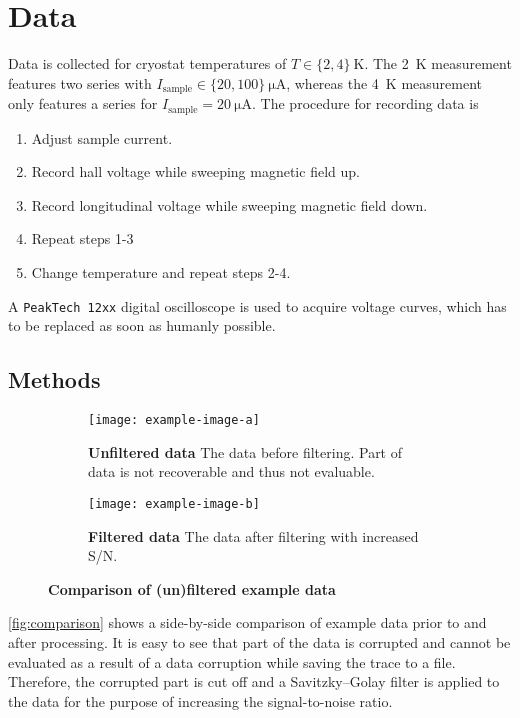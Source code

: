 \chapter{Data}
Data is collected for cryostat temperatures of $T\in\{ 2,4\}\ \si{\kelvin}$.
The \SI{2}{\kelvin} measurement features two series with $I_\text{sample}\in\{ 20,100\}\ \si{\micro\ampere}$, whereas the \SI{4}{\kelvin} measurement only features a series for $I_\text{sample}=\SI{20}{\micro\ampere}$.
The procedure for recording data is
\begin{enumerate}
	\item Adjust sample current.
	\item Record hall voltage while sweeping magnetic field up.
	\item Record longitudinal voltage while sweeping magnetic field down.
	\item Repeat steps 1-3
	\item Change temperature and repeat steps 2-4.
\end{enumerate}
A \texttt{PeakTech 12xx} digital oscilloscope is used to acquire voltage curves, which has to be replaced as soon as humanly possible.

\section{Methods} %
\begin{figure}
	\centering
	\begin{subfigure}{.48\textwidth}
		\centering
		\texttt{[image: example-image-a]}
		\caption{\textbf{Unfiltered data} The data before filtering. Part of data is not recoverable and thus not evaluable.}
	\end{subfigure}
	\hspace*{\fill}
	\begin{subfigure}{.48\textwidth}
		\centering
		\texttt{[image: example-image-b]}
		\caption{\textbf{Filtered data} The data after filtering with increased S/N.}
	\end{subfigure}
	\caption[Comparison of (un)filtered example data]{\textbf{Comparison of (un)filtered example data}}
	\label{fig:comparison}
\end{figure}
\autoref{fig:comparison} shows a side-by-side comparison of example data prior to and after processing.
It is easy to see that part of the data is corrupted and cannot be evaluated as a result of a data corruption while saving the trace to a file.
Therefore, the corrupted part is cut off and a Savitzky–Golay filter is applied to the data for the purpose of increasing the signal-to-noise ratio.

